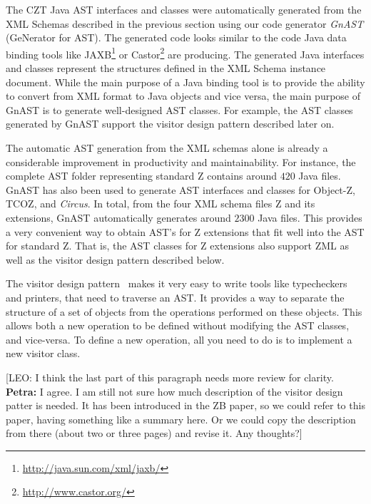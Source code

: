\documentclass{llncs}
\newcommand{\Circus}{{\sf\slshape Circus}}
\begin{document}
  The CZT Java AST interfaces and classes were automatically generated
  from the XML Schemas described in the previous section using our
  code generator \emph{GnAST} (GeNerator for AST).  The generated code
  looks similar to the code Java data binding tools like
  JAXB\footnote{\url{http://java.sun.com/xml/jaxb/}} or
  Castor\footnote{\url{http://www.castor.org/}} are producing.  The
  generated Java interfaces and classes represent the structures
  defined in the XML Schema instance document.  While the main purpose
  of a Java binding tool is to provide the ability to convert from XML
  format to Java objects and vice versa, the main purpose of GnAST is
  to generate well-designed AST classes.  For example, the AST classes
  generated by GnAST support the visitor design pattern described
  later on.

  The automatic AST generation from the XML schemas alone is already a
  considerable improvement in productivity and maintainability.  For
  instance, the complete AST folder representing standard Z contains
  around $420$ Java files.  GnAST has also been used to generate AST
  interfaces and classes for Object-Z, TCOZ, and \Circus.  In total,
  from the four XML schema files Z and its extensions, GnAST
  automatically generates around $2300$ Java files.  This provides a
  very convenient way to obtain AST's for Z extensions that fit well
  into the AST for standard Z.  That is, the AST classes for Z
  extensions also support ZML as well as the visitor design pattern
  described below.

  The visitor design pattern~\cite{GamEA:95,MaiCha:01} makes it very
  easy to write tools like typecheckers and printers, that need to
  traverse an AST. It provides a way to separate the structure of a
  set of objects from the operations performed on these objects.  This
  allows both a new operation to be defined without modifying the AST
  classes, and vice-versa.  To define a new operation, all you need to do is
  to implement a new visitor class.

  [LEO: I think the last part of this paragraph needs more review for
  clarity.  {\bf Petra:} I agree.  I am still not sure how much
  description of the visitor design patter is needed.  It has been
  introduced in the ZB paper, so we could refer to this paper, having
  something like a summary here.  Or we could copy the description
  from there (about two or three pages) and revise it.  Any thoughts?]
\end{document}
